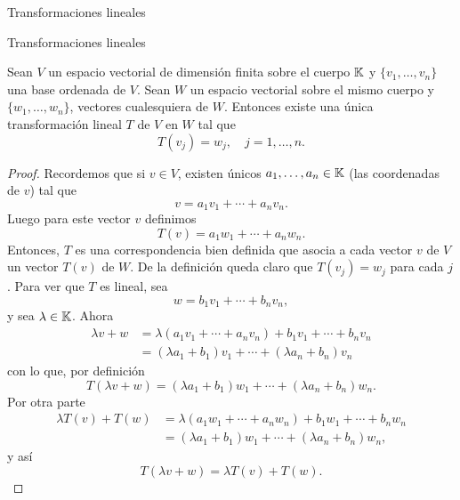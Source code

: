 \begin{chapter}{Transformaciones lineales}
\begin{section}{Transformaciones lineales}
        
        \begin{teorema}\label{th-tl-definida-en-base}
            Sean $V$ un espacio vectorial de dimensión finita sobre el cuerpo $\mathbb K$ y $\{v_1,\ldots,v_n\}$  una base ordenada de $V$. Sean $W$ un espacio vectorial sobre el mismo cuerpo y $\{w_1,\ldots,w_n\}$, vectores cualesquiera de $W$. Entonces existe una única transformación  lineal $T$ de $V$ en $W$ tal que
            \begin{equation*}
            T(v_j) = w_j, \quad j=1,\ldots,n.
            \end{equation*}
        \end{teorema}
            \begin{proof}
                Recordemos que si $v \in V$,  existen únicos $a_1,\ldots,a_n \in \mathbb K$ (las coordenadas de $v$) tal que $$v = a_1v_1 + \cdots+a_n v_n.$$  Luego para este vector $v$  definimos
                \begin{equation*}
                    T(v) = a_1w_1 + \cdots+a_n w_n.
                \end{equation*}
                Entonces, $T$ es una correspondencia bien definida que asocia a cada vector $v$ 
                de $V$ un vector $T(v)$ de $W$. De la definición queda claro que $T(v_j) = w_j$ para cada $j$. Para ver que $T$ es lineal, sea
                \begin{equation*}
                    w = b_1v_1 + \cdots+b_n v_n,
                \end{equation*}
                y sea  $\lambda \in \mathbb K$. Ahora
                \begin{align*}
                    \lambda v+w &= \lambda(a_1v_1 + \cdots+a_n v_n) + b_1v_1 + \cdots+b_n v_n \\
                    &= (\lambda a_1+b_1)v_1 + \cdots+(\lambda a_n+b_n)v_n
                \end{align*}
                con lo que, por definición
                \begin{equation*}
                    T(\lambda v+w) =(\lambda a_1+b_1)w_1 + \cdots+(\lambda a_n+b_n)w_n. 
                \end{equation*}
                Por otra parte
                \begin{align*}
                \lambda  T(v) + T(w) &= \lambda (a_1w_1 + \cdots+a_n w_n)+b_1w_1 + \cdots+b_n w_n	 \\
                 &=(\lambda a_1+b_1)w_1 + \cdots+(\lambda a_n+b_n)w_n ,			
                \end{align*}
                y así
                \begin{equation*}
                    T(\lambda v+w) = 	\lambda  T(v) + T(w).
                \end{equation*}
                

\end{proof}
\end{section}
\end{chapter}
